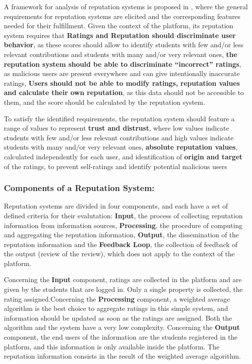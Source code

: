 \documentclass{llncs}
\begin{document}
A framework for analysis of reputation systems is proposed in \cite{vavilis2014reference}, where the general requirements for reputation systems are elicited and the corresponding features needed for their fulfillment. Given the context of the platform, its reputation system requires that \textbf{Ratings and Reputation should discriminate user behavior}, as these scores should allow to identify students with few and/or less relevant contributions and students with many and/or very relevant ones, \textbf{the reputation system should be able to discriminate ``incorrect'' ratings}, as malicious users are present everywhere and can give intentionally inaccurate ratings, \textbf{Users should not be able to modify ratings, reputation values and calculate their own reputation}, as this data should not be accessible to them, and the score should be calculated by the reputation system.

To satisfy the identified requirements, the reputation system should feature a range of values to represent \textbf{trust and distrust}, where low values indicate students with few and/or less relevant contributions and high values indicate students with many and/or very relevant ones, \textbf{absolute reputation values}, calculated independently for each user, and identification of \textbf{origin and target} of the ratings, to prevent self-ratings and identify potential malicious users

\subsubsection{Components of a Reputation System:}
Reputation systems are divided in four components\cite{liu2012systematic,liu2010evaluation}, and each have a set of defined criteria for their evalutation: \textbf{Input}, the process of collecting reputation information from information sources, \textbf{Processing}, the procedure of computing and aggregating the reputation information, \textbf{Output}, the dissemination of the reputation information and the \textbf{Feedback Loop}, the collection of feedback of the output (review of the review), which does not apply to the context of the platform.

Concerning the \textbf{Input} component, ratings are collected in the platform and are given by the students that are logged in. Only a single property is collected, the rating assigned.Concerning the \textbf{Processing} component, a weighted average algorithm is the best choice to aggregate ratings in this simple system, and information should be updated as soon as the ratings are assigned. Both the algorithm and the system have a very low complexity. Concerning the \textbf{Output} component, the end users of the information are the students registered in the platform, and this information is only available inside the platform. The reputation information consists in the result of the weighted average algorithm.
\end{document}
